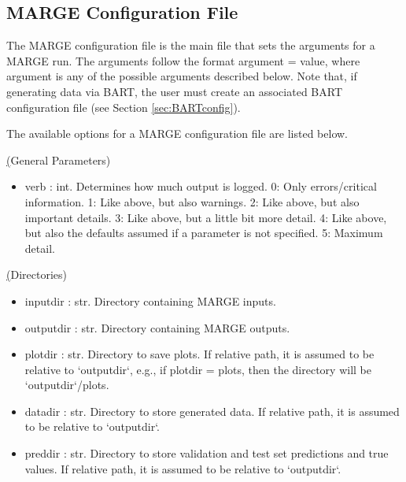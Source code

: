 \documentclass[letterpaper, 12pt]{article}
\begin{document}
\subsection{MARGE Configuration File}
\label{sec:config}
The MARGE configuration file is the main file that sets the arguments for a 
MARGE run. The arguments follow the format {\ttb argument = value}, where 
{\ttb argument} is any of the possible arguments described below. Note that, 
if generating data via BART, the user must create an associated BART 
configuration file (see Section \ref{sec:BARTconfig}).

\noindent The available options for a MARGE configuration file are listed below.

\noindent \underline(General Parameters)
\begin{itemize}
	\item verb   : int. Determines how much output is logged.  
	                          0: Only errors/critical information.  
	                          1: Like above, but also warnings.  
	                          2: Like above, but also important details.  
	                          3: Like above, but a little bit more detail.  
	                          4: Like above, but also the defaults assumed if a parameter is not specified.  
	                          5: Maximum detail.
\end{itemize}

\noindent \underline(Directories)
\begin{itemize}
\item inputdir   : str.  Directory containing MARGE inputs.
\item outputdir  : str.  Directory containing MARGE outputs.
\item plotdir    : str.  Directory to save plots. 
                         If relative path, it is assumed to be relative to `outputdir`,
                         e.g., if plotdir = plots, then the directory will be `outputdir`/plots.
\item datadir    : str.  Directory to store generated data. 
                         If relative path, it is assumed to be relative to `outputdir`.
\item preddir    : str.  Directory to store validation and test set predictions and true values. 
                         If relative path, it is assumed to be relative to `outputdir`.
\end{itemize}
\end{document}
